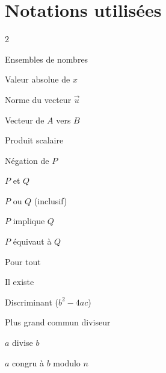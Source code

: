 \chapter*{Notations utilis\'ees}

\begin{multicols}{2}
\begin{description}[leftmargin=2.5cm, font=\color{BN}\bfseries]
  \item[$\N,\Z,\Q,\R$] Ensembles de nombres
  \item[$\abs{x}$] Valeur absolue de $x$
  \item[$\norme{\vec u}$] Norme du vecteur $\vec u$
  \item[$\vv{AB}$] Vecteur de $A$ vers $B$
  \item[$\vec u\cdot\vec v$] Produit scalaire
  \item[$\lnot P$] N\'egation de $P$
  \item[$P\land Q$] $P$ et $Q$
  \item[$P\lor Q$] $P$ ou $Q$ (inclusif)
  \item[$P\Rightarrow Q$] $P$ implique $Q$
  \item[$P\Leftrightarrow Q$] $P$ \'equivaut \`a $Q$
  \item[$\forall$] Pour tout
  \item[$\exists$] Il existe
  \item[$\Delta$] Discriminant ($b^2-4ac$)
  \item[$\pgcd(a,b)$] Plus grand commun diviseur
  \item[$a\mid b$] $a$ divise $b$
  \item[$a\equiv b\pmod n$] $a$ congru \`a $b$ modulo $n$
\end{description}
\end{multicols}

